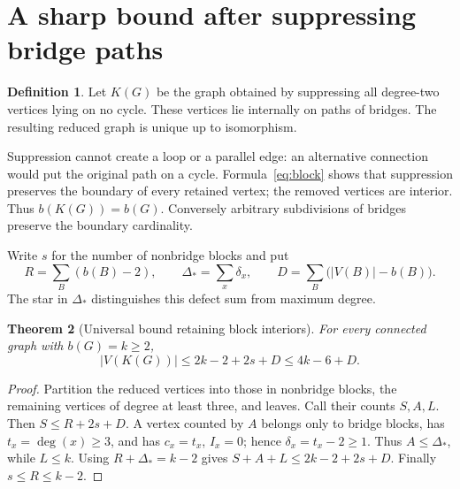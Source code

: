\documentclass[11pt,a4paper]{article}
\newtheorem{theorem}{Theorem}[section]
\theoremstyle{definition}\newtheorem{definition}[theorem]{Definition}
\theoremstyle{remark}\newtheorem{remark}[theorem]{Remark}
\newcommand{\dd}{\operatorname{deg}}
\begin{document}
\section{A sharp bound after suppressing bridge paths}
\begin{definition}
Let $K(G)$ be the graph obtained by suppressing all degree-two vertices
lying on no cycle. These vertices lie internally on paths of bridges.
The resulting reduced graph is unique up to isomorphism.
\end{definition}
Suppression cannot create a loop or a parallel edge: an alternative connection
would put the original path on a cycle. Formula~\eqref{eq:block} shows that
suppression preserves the boundary of every retained vertex; the removed
vertices are interior. Thus $b(K(G))=b(G)$. Conversely arbitrary subdivisions
of bridges preserve the boundary cardinality.

Write $s$ for the number of nonbridge blocks and put
\[
 R=\sum_B(b(B)-2),\qquad
 \Delta_*=\sum_x\delta_x,\qquad
 D=\sum_B\bigl(|V(B)|-b(B)\bigr).
\]
The star in $\Delta_*$ distinguishes this defect sum from maximum degree.

\begin{theorem}[Universal bound retaining block interiors]\label{thm:universal}
For every connected graph with $b(G)=k\ge2$,
\[
 |V(K(G))|\le 2k-2+2s+D\le4k-6+D.
\]
\end{theorem}
\begin{proof}
Partition the reduced vertices into those in nonbridge blocks, the remaining
vertices of degree at least three, and leaves. Call their counts $S,A,L$.
Then $S\le R+2s+D$. A vertex counted by $A$ belongs only to bridge blocks,
has $t_x=\dd(x)\ge3$, and has $c_x=t_x$, $I_x=0$; hence
$\delta_x=t_x-2\ge1$. Thus $A\le\Delta_*$, while $L\le k$.
Using $R+\Delta_*=k-2$ gives
$S+A+L\le2k-2+2s+D$. Finally $s\le R\le k-2$.
\end{proof}
\end{document}
